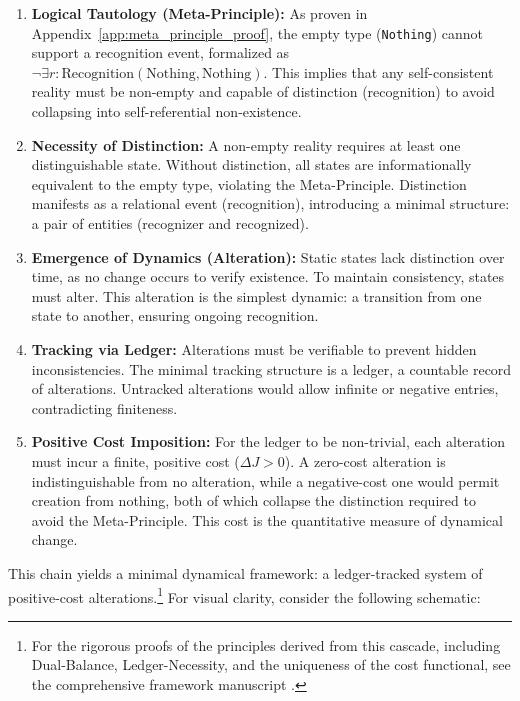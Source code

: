 \documentclass[axioms,article,submit,pdftex,oneauthor]{Definitions/mdpi}
\begin{document}
\begin{enumerate}
    \item \textbf{Logical Tautology (Meta-Principle):} As proven in Appendix~\ref{app:meta_principle_proof}, the empty type (\texttt{Nothing}) cannot support a recognition event, formalized as $\neg \exists r : \text{Recognition}(\text{Nothing}, \text{Nothing})$. This implies that any self-consistent reality must be non-empty and capable of distinction (recognition) to avoid collapsing into self-referential non-existence.
    
    \item \textbf{Necessity of Distinction:} A non-empty reality requires at least one distinguishable state. Without distinction, all states are informationally equivalent to the empty type, violating the Meta-Principle. Distinction manifests as a relational event (recognition), introducing a minimal structure: a pair of entities (recognizer and recognized).
    
    \item \textbf{Emergence of Dynamics (Alteration):} Static states lack distinction over time, as no change occurs to verify existence. To maintain consistency, states must alter. This alteration is the simplest dynamic: a transition from one state to another, ensuring ongoing recognition.
    
    \item \textbf{Tracking via Ledger:} Alterations must be verifiable to prevent hidden inconsistencies. The minimal tracking structure is a ledger, a countable record of alterations. Untracked alterations would allow infinite or negative entries, contradicting finiteness.
    
    \item \textbf{Positive Cost Imposition:} For the ledger to be non-trivial, each alteration must incur a finite, positive cost ($\Delta J > 0$). A zero-cost alteration is indistinguishable from no alteration, while a negative-cost one would permit creation from nothing, both of which collapse the distinction required to avoid the Meta-Principle. This cost is the quantitative measure of dynamical change.
\end{enumerate}

This chain yields a minimal dynamical framework: a ledger-tracked system of positive-cost alterations.\footnote{For the rigorous proofs of the principles derived from this cascade, including Dual-Balance, Ledger-Necessity, and the uniqueness of the cost functional, see the comprehensive framework manuscript \cite[Sec. 2]{washburn2025zenodo}.} For visual clarity, consider the following schematic:
\end{document}
